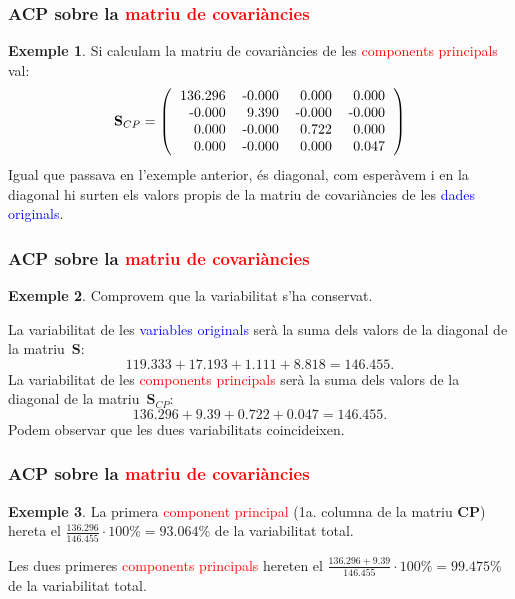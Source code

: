 \documentclass[12pt,t]{beamer}
\newcommand{\red}[1]{\textcolor{red}{#1}}
\newcommand{\blue}[1]{\textcolor{blue}{#1}}
\theoremstyle{plain}
\theoremstyle{definition}
\newtheorem{exemple}{Exemple}
\begin{document}
\begin{frame}
\frametitle{ACP sobre la \red{matriu de covariàncies}}
\begin{exemple}
Si calculam la matriu de covariàncies de les \red{components principals} val:
\[
\mathbf{S}_{CP}=\left(
\begin{tabular}{rrrr}
  136.296 & -0.000 & 0.000 & 0.000 \\ 
  -0.000 & 9.390 & -0.000 & -0.000 \\ 
  0.000 & -0.000 & 0.722 & 0.000 \\ 
  0.000 & -0.000 & 0.000 & 0.047 \\ 
  \end{tabular}\right)
\]
Igual que passava en l'exemple anterior, és diagonal, com esperàvem i en la diagonal hi surten els valors propis de la 
matriu de covariàncies de les \blue{dades originals.}
\end{exemple}
\end{frame}


\begin{frame}
\frametitle{ACP sobre la \red{matriu de covariàncies}}
\begin{exemple}
Comprovem que la variabilitat s'ha conservat. 
\medskip

La variabilitat de les \blue{variables originals} serà la suma dels valors de la diagonal de la matriu~$\mathbf{S}$:
\[
119.333 + 17.193 + 
1.111 + 8.818 = 146.455.
\]
La variabilitat de les \red{components principals} serà la suma dels valors de la diagonal de la 
matriu~$\mathbf{S}_{CP}$:
\[
136.296 + 9.39 + 0.722 
+0.047= 146.455.
\]
Podem observar que les dues variabilitats coincideixen.
\end{exemple}
\end{frame}

\begin{frame}
\frametitle{ACP sobre la \red{matriu de covariàncies}}
\begin{exemple}

La primera \red{component principal} (1a. columna de la matriu $\mathbf{CP}$) hereta el 
$\frac{136.296}{146.455}\cdot 100\% = 
93.064\%$ de la variabilitat total.

Les dues primeres \red{components principals} hereten el 
$\frac{136.296 + 
9.39}{146.455}\cdot 100\% = 
99.475\%$ de la variabilitat total.
\end{exemple}
\end{frame}
\end{document}
